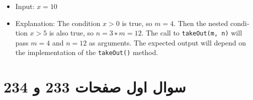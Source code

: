 \documentclass{article}
\begin{document}
\subsubsection{}
\begin{latin}
\begin{itemize}
\item Input: $x=10$
\item Explanation: The condition $x>0$ is true, so $m=4$. Then the nested condition $x>5$ is also true, so $n=3∗m=12$. The call to \texttt{takeOut(m, n)} will pass $m=4$ and $n=12$ as arguments. The expected output will depend on the implementation of the \texttt{takeOut()} method.
\end{itemize}
\end{latin}


\section{سوال اول صفحات 233 و 234}
\end{document}
